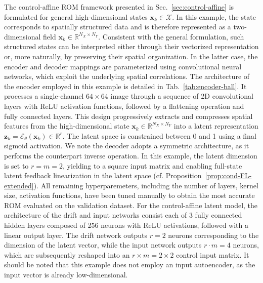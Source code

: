 \documentclass{article}
\begin{document}
The control-affine ROM framework presented in Sec.~\ref{sec:control-affine} is formulated for general high-dimensional states $\mathbf{x}_k \in \mathcal{X}$.
In this example, the state corresponds to spatially structured data and is therefore represented as a two-dimensional field $\mathbf{x}_k \in \mathbb{R}^{N_X \times N_Y}$.
Consistent with the general formulation, such structured states can be interpreted either through their vectorized representation or, more naturally, by preserving their spatial organization.
In the latter case, the encoder and decoder mappings are parameterized using convolutional neural networks, which exploit the underlying spatial correlations.
The architecture of the encoder employed in this example is detailed in Tab.~\ref{tab:encoder-ball}.
It processes a single-channel $64 \times 64$ image through a sequence of 2D convolutional layers with ReLU activation functions, followed by a flattening operation and fully connected layers.
This design progressively extracts and compresses spatial features from the high-dimensional state $\mathbf{x}_k \in \mathbb{R}^{N_X \times N_Y}$ into a latent representation $\mathbf{z}_k = \mathcal{E}_\theta(\mathbf{x}_k) \in \mathbb{R}^r$.
The latent space is constrained between 0 and 1 using a final sigmoid activation.
We note the decoder adopts a symmetric architecture, as it performs the counterpart inverse operation.
In this example, the latent dimension is set to $r=m=2$, yielding to a square input matrix and enabling full-state latent feedback linearization in the latent space (cf. Proposition~\ref{prop:cond-FL-extended}).
All remaining hyperparemeters, including the number of layers, kernel size, activation functions, have been tuned manually to obtain the most accurate ROM evaluated on the validation dataset.
For the control-affine latent model, the architecture of the drift and input networks consist each of 3 fully connected hidden layers composed of 256 neurons with ReLU activations, followed with a linear output layer.
The drift network outputs $r=2$ neurons corresponding to the dimension of the latent vector, while the input network outputs $r \cdot m=4$ neurons, which are subsequently reshaped into an $r \times m=2 \times 2$ control input matrix.
It should be noted that this example does not employ an input autoencoder, as the input vector is already low-dimensional.
\end{document}
